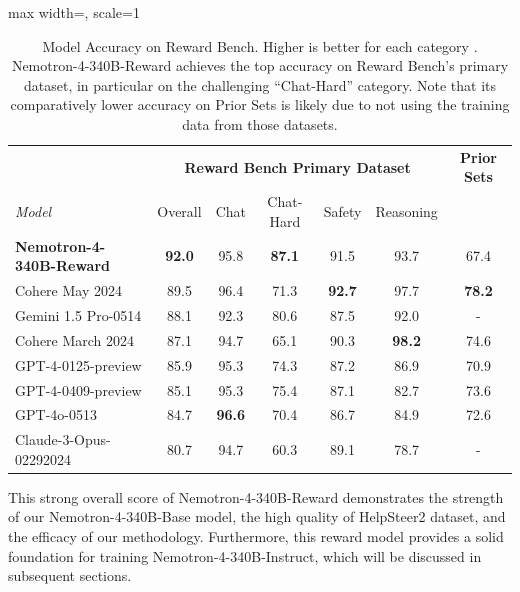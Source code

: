 \documentclass[11pt]{article}
\newcommand{\ours}{Nemotron-4-340B-Base}
\newcommand{\oursin}{Nemotron-4-340B-Instruct}
\newcommand{\oursrm}{Nemotron-4-340B-Reward}
\begin{document}
\begin{table}[ht!]
\centering
\begin{adjustbox}{max width=\columnwidth, scale=1
}
\begin{tabular}{l|ccccc|c}
\toprule
& \multicolumn{5}{c|}{\textbf{Reward Bench Primary Dataset}} & \textbf{Prior Sets} \\
\textit{Model} &  Overall & Chat & Chat-Hard & Safety & Reasoning \\
\midrule
\textbf{\oursrm{}} & \textbf{92.0} & 95.8  & \textbf{87.1} & 91.5 & 93.7 & 67.4 \\
Cohere May 2024 & 89.5 & 96.4 & 71.3 & \textbf{92.7} & 97.7 & \textbf{78.2}\\
Gemini 1.5 Pro-0514 & 88.1 & 92.3 & 80.6 & 87.5 & 92.0 & -\\
Cohere March 2024 & 87.1 & 94.7 & 65.1 & 90.3 & \textbf{98.2} & 74.6 \\
GPT-4-0125-preview & 85.9 & 95.3 & 74.3 & 87.2 & 86.9 & 70.9\\
GPT-4-0409-preview & 85.1 & 95.3 & 75.4 & 87.1 & 82.7 & 73.6\\
GPT-4o-0513 & 84.7 & \textbf{96.6} & 70.4 & 86.7 & 84.9 & 72.6\\
Claude-3-Opus-02292024 & 80.7 & 94.7 & 60.3 & 89.1 & 78.7 & -\\

\bottomrule
\end{tabular}
\end{adjustbox}
\caption[Evaluating Reward Models on Reward Bench]{Model Accuracy on Reward Bench. Higher is better for each category \citep{rewardbenchleaderboard}.
\oursrm{} achieves the top accuracy on Reward Bench's primary dataset, in particular on the challenging ``Chat-Hard'' category.
Note that its comparatively lower accuracy on Prior Sets is likely due to not using the training data from those datasets.
}
\label{tab:rewardbench}
\end{table}

This strong overall score of \oursrm{} demonstrates the strength of our \ours{} model, the high quality of HelpSteer2 dataset, and the efficacy of our methodology. Furthermore, this reward model provides a solid foundation for training \oursin{}, which will be discussed in subsequent sections.
\end{document}

